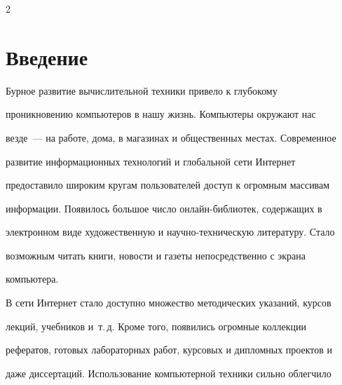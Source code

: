 \vspace*{2pt}












      \thispagestyle{headings}



      \begin{multicols}{2}



            \label{st\stat}





\section{Введение}

  

  Бурное развитие вычислительной техники привело к глубокому 

проникновению компьютеров в нашу жизнь. Компьютеры окружают нас 

везде~--- на работе, дома, в магазинах и общественных мес\-тах. Современное 

развитие информационных технологий и глобальной сети Интернет 

предоставило широким кругам пользователей доступ к огромным массивам 

информации. Появилось большое чис\-ло он\-лайн-биб\-лио\-тек, содержащих в 

электронном виде художественную и научно-техническую литературу. Стало 

возможным читать книги, новости и газеты непосредственно с экрана 

компьютера. 

  

  В сети Интернет стало доступно множество методических указаний, курсов 

лекций, учебников и~т.\,д. Кроме того, появились огромные коллекции 

рефератов, готовых лабораторных работ, курсовых и дипломных проектов и 

даже диссертаций. Использование компьютерной техники сильно облегчило 


\end{multicols}
